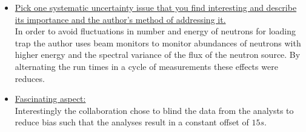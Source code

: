 \documentclass[12pt]{article}
\begin{document}
\begin{itemize}
	\item \ul{Pick one systematic uncertainty issue that you find interesting and describe  its importance and the author's method of addressing it.}\\
	\noindent
	In order to avoid fluctuations in number and energy of neutrons for loading trap the author uses beam monitors to monitor abundances of neutrons with higher energy and the spectral variance of the flux of the neutron source. By alternating the run times in a cycle of measurements these effects were reduces. 
	\item \ul{Fascinating aspect:} \\
	\noindent
	Interestingly the collaboration chose to blind the data from the analysts to reduce bias such that the analyses result in a constant offset of $15s$. 
\end{itemize}
\end{document}
